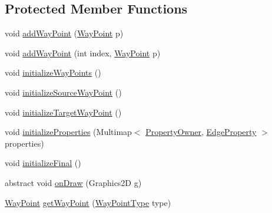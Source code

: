\subsection*{Protected Member Functions}
\begin{DoxyCompactItemize}
\item 
void \hyperlink{classorg_1_1tzi_1_1use_1_1gui_1_1views_1_1diagrams_1_1elements_1_1edges_1_1_edge_base_a4a9e701a146a842a315aad48eb550d02}{add\-Way\-Point} (\hyperlink{classorg_1_1tzi_1_1use_1_1gui_1_1views_1_1diagrams_1_1waypoints_1_1_way_point}{Way\-Point} p)
\item 
void \hyperlink{classorg_1_1tzi_1_1use_1_1gui_1_1views_1_1diagrams_1_1elements_1_1edges_1_1_edge_base_ab9c2b0c7f0b4d8c05251035a96fcebeb}{add\-Way\-Point} (int index, \hyperlink{classorg_1_1tzi_1_1use_1_1gui_1_1views_1_1diagrams_1_1waypoints_1_1_way_point}{Way\-Point} p)
\item 
void \hyperlink{classorg_1_1tzi_1_1use_1_1gui_1_1views_1_1diagrams_1_1elements_1_1edges_1_1_edge_base_a7680c49bdf8c3c27d1616b99a4ab5d61}{initialize\-Way\-Points} ()
\item 
void \hyperlink{classorg_1_1tzi_1_1use_1_1gui_1_1views_1_1diagrams_1_1elements_1_1edges_1_1_edge_base_a782de579e539b27a08e43630e3ed3672}{initialize\-Source\-Way\-Point} ()
\item 
void \hyperlink{classorg_1_1tzi_1_1use_1_1gui_1_1views_1_1diagrams_1_1elements_1_1edges_1_1_edge_base_a38a3bdb62121656de1bc5382a29276f0}{initialize\-Target\-Way\-Point} ()
\item 
void \hyperlink{classorg_1_1tzi_1_1use_1_1gui_1_1views_1_1diagrams_1_1elements_1_1edges_1_1_edge_base_a7ebbd9a13f2179916ef2c27afc42c6ad}{initialize\-Properties} (Multimap$<$ \hyperlink{enumorg_1_1tzi_1_1use_1_1gui_1_1views_1_1diagrams_1_1elements_1_1edges_1_1_edge_base_1_1_property_owner}{Property\-Owner}, \hyperlink{classorg_1_1tzi_1_1use_1_1gui_1_1views_1_1diagrams_1_1elements_1_1_edge_property}{Edge\-Property} $>$ properties)
\item 
void \hyperlink{classorg_1_1tzi_1_1use_1_1gui_1_1views_1_1diagrams_1_1elements_1_1edges_1_1_edge_base_a0dfaaad1007bb53cd119f648c17b742a}{initialize\-Final} ()
\item 
abstract void \hyperlink{classorg_1_1tzi_1_1use_1_1gui_1_1views_1_1diagrams_1_1elements_1_1edges_1_1_edge_base_afe02169250267b4dd72e3fcc2e4d145f}{on\-Draw} (Graphics2\-D g)
\item 
\hyperlink{classorg_1_1tzi_1_1use_1_1gui_1_1views_1_1diagrams_1_1waypoints_1_1_way_point}{Way\-Point} \hyperlink{classorg_1_1tzi_1_1use_1_1gui_1_1views_1_1diagrams_1_1elements_1_1edges_1_1_edge_base_ae8db66f98174606e3272107366dee3a4}{get\-Way\-Point} (\hyperlink{enumorg_1_1tzi_1_1use_1_1gui_1_1views_1_1diagrams_1_1waypoints_1_1_way_point_type}{Way\-Point\-Type} type)

\end{DoxyCompactItemize}
